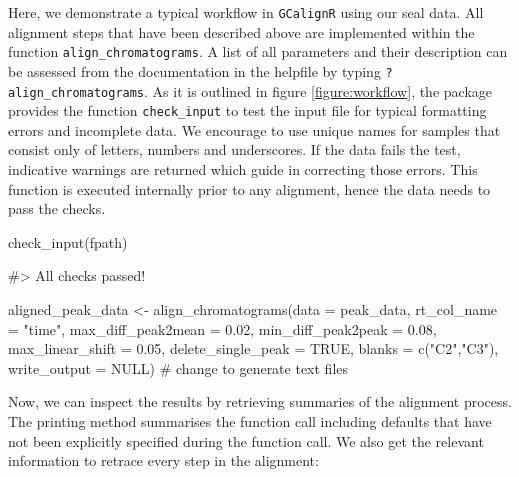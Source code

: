 Here, we demonstrate a typical workflow in \texttt{GCalignR} using our
seal data. All alignment steps that have been described above are
implemented within the function \texttt{align\_chromatograms}. A list of
all parameters and their description can be assessed from the
documentation in the helpfile by typing \texttt{?align\_chromatograms}.
As it is outlined in figure \ref{figure:workflow}, the package provides
the function \texttt{check\_input} to test the input file for typical
formatting errors and incomplete data. We encourage to use unique names
for samples that consist only of letters, numbers and underscores. If
the data fails the test, indicative warnings are returned which guide in
correcting those errors. This function is executed internally prior to
any alignment, hence the data needs to pass the checks.

\begin{Schunk}
\begin{Sinput}
check_input(fpath)
\end{Sinput}
\begin{Soutput}
#> All checks passed!
\end{Soutput}
\end{Schunk}

\begin{Schunk}
\begin{Sinput}
aligned_peak_data <- align_chromatograms(data = peak_data,
        rt_col_name = "time",
        max_diff_peak2mean = 0.02,
        min_diff_peak2peak = 0.08,
        max_linear_shift = 0.05,
        delete_single_peak = TRUE,
        blanks = c("C2","C3"), 
        write_output = NULL) # change to generate text files
\end{Sinput}
\end{Schunk}

Now, we can inspect the results by retrieving summaries of the alignment
process. The printing method summarises the function call including
defaults that have not been explicitly specified during the function
call. We also get the relevant information to retrace every step in the
alignment:

